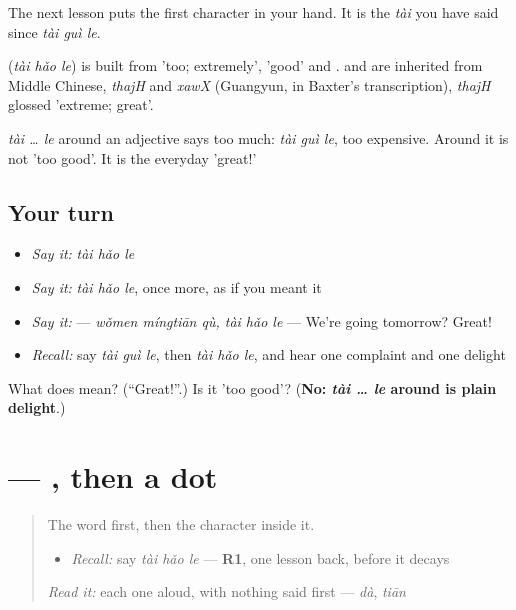 The next lesson puts the first character in your hand. It is the \emph{tài} you have said since \emph{tài guì le}.

\begin{cousinweb}
\textbf{} (\emph{tài hǎo le}) is built from  'too; extremely',  'good' and .  and  are inherited from Middle Chinese, \emph{thajH} and \emph{xawX} (Guangyun, in Baxter's transcription), \emph{thajH} glossed 'extreme; great'.
\end{cousinweb}

\begin{grammarlens}[title={What you've built}]
\emph{tài … le} around an adjective says too much: \emph{tài guì le}, too expensive. Around  it is not 'too good'. It is the everyday 'great!'
\end{grammarlens}

\subsection*{Your turn}
\begin{itemize}
\raggedright
  \item \emph{Say it:} \emph{tài hǎo le}
  \item \emph{Say it:} \emph{tài hǎo le}, once more, as if you meant it
  \item \emph{Say it:}   — \emph{wǒmen míngtiān qù, tài hǎo le} — We're going tomorrow? Great!
  \item \emph{Recall:} say \emph{tài guì le}, then \emph{tài hǎo le}, and hear one complaint and one delight
\end{itemize}

\begin{tcolorbox}[breakable,colback=teal!4,colframe=teal!35!black,title={Before you move on}]
What does  mean? (\textquotedblleft{}Great!\textquotedblright{}.) Is it 'too good'? (\textbf{No: \emph{tài … le} around  is plain delight}.)
\end{tcolorbox}
\section[\texorpdfstring{\zh{太} (tài)}{太 (tài)}]{ — , then a dot}

\label{lesson:ZH-W93-tai}



\begin{quote}
The word first, then the character inside it.

\begin{itemize}
\raggedright
  \item \emph{Recall:} say \emph{tài hǎo le} — \textbf{R1}, one lesson back, before it decays
\end{itemize}

\begin{quote}
 
\end{quote}

\emph{Read it:} each one aloud, with nothing said first — \emph{dà}, \emph{tiān}
\end{quote}

